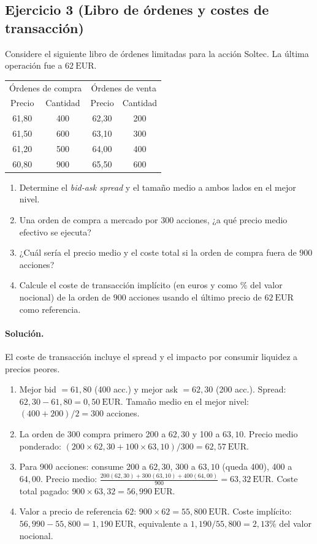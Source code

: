 \documentclass[12pt,a4paper]{article}
\newcommand{\EUR}[1]{\ensuremath{#1~\text{EUR}}}
\newenvironment{ejercicio}[1]{\subsection*{Ejercicio #1}}{}
\newenvironment{solucion}{\paragraph{Solución.}}{}
\begin{document}
 \begin{ejercicio}{3 (Libro de órdenes y costes de transacción)}
 Considere el siguiente libro de órdenes limitadas para la acción Soltec. La última operación fue a \EUR{62}.
 \begin{center}
 \begin{tabular}{cc|cc}
 \toprule
 \multicolumn{2}{c|}{Órdenes de compra} & \multicolumn{2}{c}{Órdenes de venta} \\
 Precio & Cantidad & Precio & Cantidad\\
 \midrule
 61{,}80 & 400 & 62{,}30 & 200\\
 61{,}50 & 600 & 63{,}10 & 300\\
 61{,}20 & 500 & 64{,}00 & 400\\
 60{,}80 & 900 & 65{,}50 & 600\\
 \bottomrule
 \end{tabular}
 \end{center}
 \begin{enumerate}[label=\alph*)]
   \item Determine el \emph{bid-ask spread} y el tamaño medio a ambos lados en el mejor nivel.
   \item Una orden de compra a mercado por \(300\) acciones, ¿a qué precio medio efectivo se ejecuta?
   \item ¿Cuál sería el precio medio y el coste total si la orden de compra fuera de \(900\) acciones?
   \item Calcule el coste de transacción implícito (en euros y como \% del valor nocional) de la orden de \(900\) acciones usando el último precio de \EUR{62} como referencia.
 \end{enumerate}
 \end{ejercicio}
 \begin{solucion}
 El coste de transacción incluye el spread y el impacto por consumir liquidez a precios peores.
 \begin{enumerate}[label=\alph*)]
   \item Mejor bid \(=61{,}80\) (400 acc.) y mejor ask \(=62{,}30\) (200 acc.). Spread: \(62{,}30-61{,}80 = \EUR{0{,}50}\). Tamaño medio en el mejor nivel: \((400+200)/2 = 300\) acciones.
   \item La orden de 300 compra primero 200 a \(62{,}30\) y 100 a \(63{,}10\). Precio medio ponderado: \((200\times 62{,}30 + 100\times 63{,}10)/300 = \EUR{62{,}57}\).
  \item Para 900 acciones: consume 200 a \(62{,}30\), 300 a \(63{,}10\) (queda 400), 400 a \(64{,}00\). Precio medio: \(\frac{200(62{,}30)+300(63{,}10)+400(64{,}00)}{900} = \EUR{63{,}32}\). Coste total pagado: \(900\times 63{,}32 = \EUR{56{,}990}\).
  \item Valor a precio de referencia \(62\): \(900\times 62 = \EUR{55{,}800}\). Coste implícito: \(56{,}990-55{,}800 = \EUR{1{,}190}\), equivalente a \(1{,}190/55{,}800 = 2{,}13\%\) del valor nocional.
 \end{enumerate}
 \end{solucion}
\end{document}
